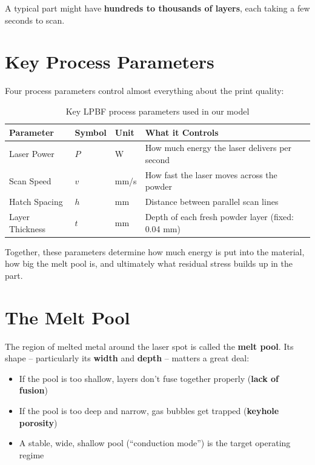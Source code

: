 \documentclass[12pt,a4paper]{report}
\begin{document}
A typical part might have \textbf{hundreds to thousands of layers}, each taking a few seconds to scan.

\section{Key Process Parameters}

Four process parameters control almost everything about the print quality:

\begin{table}[h!]
\centering
\caption{Key LPBF process parameters used in our model}
\begin{tabular}{@{}llll@{}}
\toprule
\textbf{Parameter} & \textbf{Symbol} & \textbf{Unit} & \textbf{What it Controls} \\
\midrule
Laser Power & $P$ & W & How much energy the laser delivers per second \\
Scan Speed & $v$ & mm/s & How fast the laser moves across the powder \\
Hatch Spacing & $h$ & mm & Distance between parallel scan lines \\
Layer Thickness & $t$ & mm & Depth of each fresh powder layer (fixed: 0.04 mm) \\
\bottomrule
\end{tabular}
\end{table}

Together, these parameters determine how much energy is put into the material, how big the melt pool is, and ultimately what residual stress builds up in the part.

\section{The Melt Pool}

The region of melted metal around the laser spot is called the \textbf{melt pool}. Its shape -- particularly its \textbf{width} and \textbf{depth} -- matters a great deal:

\begin{itemize}
  \item If the pool is too shallow, layers don't fuse together properly (\textbf{lack of fusion})
  \item If the pool is too deep and narrow, gas bubbles get trapped (\textbf{keyhole porosity})
  \item A stable, wide, shallow pool (``conduction mode'') is the target operating regime
\end{itemize}
\end{document}
